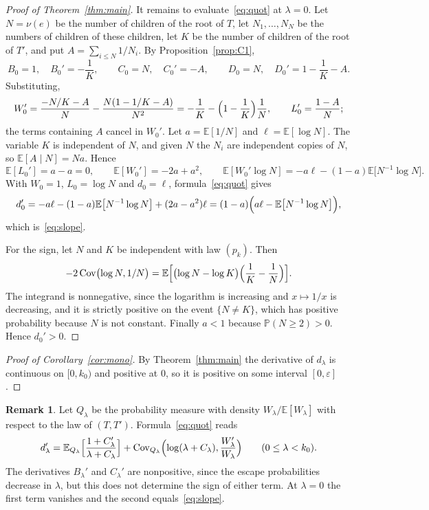 \documentclass[11pt]{amsart}
\theoremstyle{definition}
\newtheorem{remark}[theorem]{Remark}
\newcommand{\Prob}{\mathbb{P}}
\newcommand{\E}{\mathbb{E}}
\newcommand{\eps}{\varepsilon}
\newcommand{\Cov}{\operatorname{Cov}}
\begin{document}
\begin{proof}[Proof of Theorem~\ref{thm:main}]
It remains to evaluate~\eqref{eq:quot} at $\lambda=0$. Let $N=\nu(e)$ be the number of children of the root of
$T$, let $N_1,\dots,N_N$ be the numbers of children of these children, let $K$ be the number of children of the
root of $T'$, and put $A=\sum_{i\le N}1/N_i$. By Proposition~\ref{prop:C1},
\[
   B_0=1,\quad B_0'=-\frac1K,\qquad C_0=N,\quad C_0'=-A,\qquad D_0=N,\quad D_0'=1-\frac1K-A .
\]
Substituting,
\begin{equation}\label{eq:W0}
   W_0'=\frac{-N/K-A}{N}-\frac{N(1-1/K-A)}{N^2}=-\frac1K-\Bigl(1-\frac1K\Bigr)\frac1N,\qquad
   L_0'=\frac{1-A}{N};
\end{equation}
the terms containing $A$ cancel in $W_0'$. Let $a=\E[1/N]$ and $\ell=\E[\log N]$. The variable $K$ is independent
of $N$, and given $N$ the $N_i$ are independent copies of $N$, so $\E[A\mid N]=Na$. Hence
\[
   \E[L_0']=a-a=0,\qquad \E[W_0']=-2a+a^2,\qquad
   \E[W_0'\log N]=-a\ell-(1-a)\E\bigl[N^{-1}\log N\bigr].
\]
With $W_0=1$, $L_0=\log N$ and $d_0=\ell$, formula~\eqref{eq:quot} gives
\[
   d_0'=-a\ell-(1-a)\E\bigl[N^{-1}\log N\bigr]+(2a-a^2)\ell
       =(1-a)\Bigl(a\ell-\E\bigl[N^{-1}\log N\bigr]\Bigr),
\]
which is~\eqref{eq:slope}.

For the sign, let $N$ and $K$ be independent with law $(p_k)$. Then
\[
   -2\Cov\bigl(\log N,1/N\bigr)=\E\Bigl[\bigl(\log N-\log K\bigr)\Bigl(\frac1K-\frac1N\Bigr)\Bigr].
\]
The integrand is nonnegative, since the logarithm is increasing and $x\mapsto1/x$ is decreasing, and it is
strictly positive on the event $\{N\ne K\}$, which has positive probability because $N$ is not constant. Finally
$a<1$ because $\Prob(N\ge2)>0$. Hence $d_0'>0$.
\end{proof}

\begin{proof}[Proof of Corollary~\ref{cor:mono}]
By Theorem~\ref{thm:main} the derivative of $d_\lambda$ is continuous on $[0,k_0)$ and positive at $0$, so it is
positive on some interval $[0,\eps]$.
\end{proof}

\begin{remark}
Let $Q_\lambda$ be the probability measure with density $W_\lambda/\E[W_\lambda]$ with respect to the law of
$(T,T')$. Formula~\eqref{eq:quot} reads
\[
   d_\lambda'=\E_{Q_\lambda}\Bigl[\frac{1+C_\lambda'}{\lambda+C_\lambda}\Bigr]
     +\Cov_{Q_\lambda}\Bigl(\log(\lambda+C_\lambda),\frac{W_\lambda'}{W_\lambda}\Bigr)\qquad(0\le\lambda<k_0).
\]
The derivatives $B_\lambda'$ and $C_\lambda'$ are nonpositive, since the escape probabilities decrease in
$\lambda$, but this does not determine the sign of either term. At $\lambda=0$ the first term vanishes and the
second equals~\eqref{eq:slope}.
\end{remark}
\end{document}
